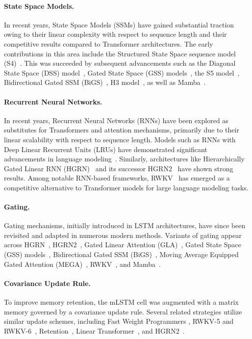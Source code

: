 \paragraph{State Space Models.} In recent years, State Space Models (SSMs) have gained substantial traction owing to their linear complexity with respect to sequence length and their competitive results compared to Transformer architectures. The early contributions in this area include the Structured State Space sequence model (S4)~\citep{Gu:21}. This was succeeded by subsequent advancements such as the Diagonal State Space (DSS) model~\citep{Gupta:22}, Gated State Space (GSS) models~\citep{Mehta:22}, the S5 model~\citep{Smith:22}, Bidirectional Gated SSM (BiGS)~\citep{Wang:22}, H3 model~\citep{Fu:23}, as well as Mamba~\citep{Gu:24arxiv}.

\paragraph{Recurrent Neural Networks.} In recent years, Recurrent Neural Networks (RNNs) have been explored as substitutes for Transformers and attention mechanisms, primarily due to their linear scalability with respect to sequence length. Models such as RNNs with Deep Linear Recurrent Units (LRUs) have demonstrated significant advancements in language modeling~\citep{Orvieto:23, De:24arxiv}. Similarly, architectures like Hierarchically Gated Linear RNN (HGRN)~\citep{Qin:23} and its successor HGRN2~\citep{Qin:24arxiv} have shown strong results. Among notable RNN-based frameworks, RWKV~\citep{Peng:23arxivshort,Peng:24arxivshort} has emerged as a competitive alternative to Transformer models for large language modeling tasks.

\paragraph{Gating.}
Gating mechanisms, initially introduced in LSTM architectures, have since been revisited and adapted in numerous modern methods. Variants of gating appear across HGRN~\citep{Qin:23}, HGRN2~\citep{Qin:24arxiv}, Gated Linear Attention (GLA)~\citep{Yang:23arxiv}, Gated State Space (GSS) models~\citep{Mehta:22}, Bidirectional Gated SSM (BiGS)~\citep{Wang:22}, Moving Average Equipped Gated Attention (MEGA)~\citep{Ma:22}, RWKV~\citep{Peng:23arxivshort}, and Mamba~\citep{Gu:24arxiv}.

\paragraph{Covariance Update Rule.} To improve memory retention, the mLSTM cell was augmented with a matrix memory governed by a covariance update rule. Several related strategies utilize similar update schemes, including Fast Weight Programmers \citep{Schmidhuber:92ncfastweights,Schlag:21}, RWKV-5 and RWKV-6~\citep{Peng:24arxivshort}, Retention~\citep{Sun:23arxiv}, Linear Transformer~\citep{Katharopoulos:20}, and HGRN2~\citep{Qin:24arxiv}.

